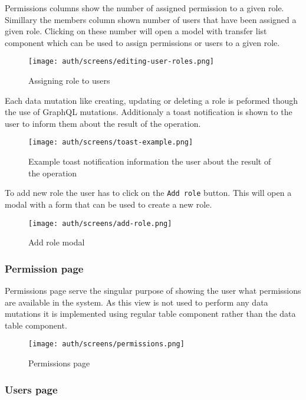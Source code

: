 \documentclass[../main.tex]{subfiles}
\begin{document}
Permissions columns show the number of assigned permission to a given role.
Simillary the members column shown number of users that have been assigned a given role.
Clicking on these number will open a model with transfer list component which can be used to assign permissions or users to a given role.

\begin{figure}[H]
  \centering
  \texttt{[image: auth/screens/editing-user-roles.png]}
  \caption{Assigning role to users}
\end{figure}

Each data mutation like creating, updating or deleting a role is peformed though the use of GraphQL mutations.
Additionaly a toast notification is shown to the user to inform them about the result of the operation.

\begin{figure}[H]
  \centering
  \texttt{[image: auth/screens/toast-example.png]}
  \caption{Example toast notification information the user about the result of the operation}
\end{figure}

To add new role the user has to click on the \texttt{Add role} button. This will open a modal with a form that can be used to create a new role.

\begin{figure}[H]
  \centering
  \texttt{[image: auth/screens/add-role.png]}
  \caption{Add role modal}
\end{figure}

\subsubsection{Permission page}

Permissions page serve the singular purpose of showing the user what permissions are available in the system.
As this view is not used to perform any data mutations it is implemented using regular table component rather than the data table component.

\begin{figure}[H]
  \centering
  \texttt{[image: auth/screens/permissions.png]}
  \caption{Permissions page}
\end{figure}

\subsubsection{Users page}
\end{document}
